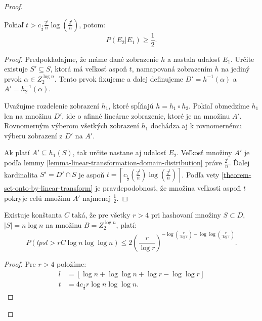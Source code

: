 \begin{proof}
\begin{remark}
\label{remark-prob-t-length-chain}
Pokiaľ $t > c_{\frac{1}{2}}{\frac{2^l}{n}}\log\left(\frac{2^l}{n}\right)$, potom:
\begin{displaymath}
P(E_2 | E_1) \geq \frac{1}{2} \textit{.}
\end{displaymath}
\end{remark}
\begin{proof}
Predpokladajme, že máme dané zobrazenie $h$ a nastala udalosť $E_1$. Určite existuje $S' \subseteq S$, ktorá má veľkosť aspoň $t$, namapovaná zobrazením $h$ na jediný prvok $\alpha \in Z_2^{\log n}$. Tento prvok fixujeme a ďalej definujeme $D' = h^{-1}(\alpha)$ a $A' = h_2^{-1}(\alpha)$. 

Uvažujme rozdelenie zobrazení $h_1$, ktoré spĺňajú $h = h_1 \circ h_2$. Pokiaľ obmedzíme $h_1$ len na množinu $D'$, ide o afinné lineárne zobrazenie, ktoré je na množinu $A'$. Rovnomerným výberom všetkých zobrazení $h_1$ dochádza aj k rovnomernému výberu zobrazení z $D'$ na $A'$.

Ak platí $A' \subseteq h_1(S)$, tak určite nastane aj udalosť $E_2$. Veľkosť množiny $A'$ je podľa lemmy \ref{lemma-linear-transformation-domain-distribution} práve $\frac{2^l}{n}$. Ďalej kardinalita $S' = D' \cap S$ je aspoň $t = \left\lceil c_{\frac{1}{2}}\left(\frac{2^l}{n}\right)\log\left(\frac{2^l}{n}\right)\right\rceil$. Podľa vety \ref{theorem-set-onto-by-linear-transform} je pravdepodobnosť, že množina veľkosti aspoň $t$ pokryje celú množinu $A'$ najmenej $\frac{1}{2}$.
\end{proof}

\begin{remark}
Existuje konštanta $C$ taká, že pre všetky $r > 4$ pri hashovaní množiny $S \subset D$, $|S| = n \log n$ na množinu $B = Z_2^{\log n}$, platí:
\begin{displaymath}
P(lpsl > rC \log n \log \log n) \leq 2 \left(\frac{r}{\log r}\right)^{-\log \left(\frac{r}{\log r}\right) - \log \log \left(\frac{r}{\log r}\right)}\textit{.}
\end{displaymath}
\end{remark}
\begin{proof}
Pre $r > 4$ položíme:
\begin{displaymath}
\begin{split}
l & = \left\lfloor \log n + \log \log n + \log r - \log \log r \right\rfloor \\
t & = 4c_{\frac{1}{2}}r\log n \log \log n \textit{.}
\end{split}
\end{displaymath}


\end{proof}
\end{proof}
